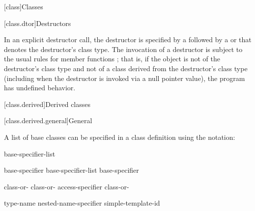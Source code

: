 \documentclass{wg21}
\begin{document}
[class]{Classes}

[class.dtor]{Destructors}%


\pnum
{}%
In an explicit destructor call, the destructor is specified by a
\tcode{\~{}}
followed by a
 or 
that denotes the destructor's class type.
The invocation of a destructor is subject to the usual rules for member
functions ;
that is, if the object is not of the destructor's class type and
not of a class derived from the destructor's class type (including when
the destructor is invoked via a null pointer value), the program has
undefined behavior.

[class.derived]{Derived classes}%

[class.derived.general]{General}%


\pnum
{}%
%
%
A list of base classes can be specified in a class definition using
the notation:

\begin{bnf}
    \br
    \terminal{:} base-specifier-list
\end{bnf}


\begin{bnf}
    \br
    base-specifier \br
    base-specifier-list \terminal{,} base-specifier 
\end{bnf}

\begin{bnf}
    \br
     class-or-\br
       class-or-\br
     access-specifier  class-or-
\end{bnf}

\begin{bnf}
    \br
     type-name\br
    nested-name-specifier  simple-template-id\br
\end{bnf}
\end{document}
